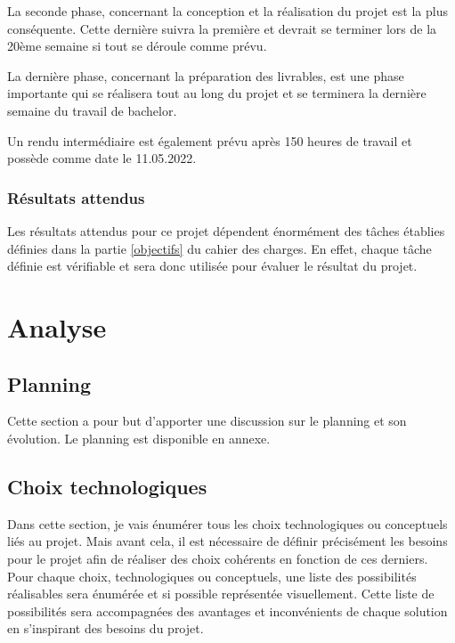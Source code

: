 \documentclass[
    iai, %
    il, %
]{heig-tb}
\begin{document}
La seconde phase, concernant la conception et la réalisation du projet est la plus conséquente.
Cette dernière suivra la première et devrait se terminer lors de la 20ème semaine si tout se déroule comme prévu.

La dernière phase, concernant la préparation des livrables, est une phase importante qui se réalisera tout au long du projet et se terminera la dernière semaine du travail de bachelor.

Un rendu intermédiaire est également prévu après 150 heures de travail et possède comme date le 11.05.2022.

\subsection{Résultats attendus}

Les résultats attendus pour ce projet dépendent énormément des tâches établies définies dans la partie \ref{objectifs} du cahier des charges.\newline
En effet, chaque tâche définie est vérifiable et sera donc utilisée pour évaluer le résultat du projet.
\newpage

\chapter{Analyse}

\section{Planning}
Cette section a pour but d'apporter une discussion sur le planning et son évolution.
Le planning est disponible en annexe.

\section{Choix technologiques}

Dans cette section, je vais énumérer tous les choix technologiques ou conceptuels liés au projet.
Mais avant cela, il est nécessaire de définir précisément les besoins pour le projet afin de réaliser des choix cohérents en fonction de ces derniers.\newline
Pour chaque choix, technologiques ou conceptuels, une liste des possibilités réalisables sera énumérée et si possible représentée visuellement.\newline
Cette liste de possibilités sera accompagnées des avantages et inconvénients de chaque solution en s'inspirant des besoins du projet.
\end{document}

